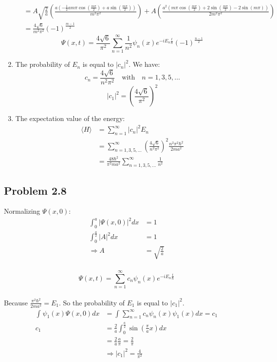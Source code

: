 \documentclass{article}
\begin{document}
\begin{enumerate}[label=(\alph*)]
\begin{align}
            &= A\sqrt{\frac{2}{a}} \left(\frac{a\left(-\frac{1}{2} a m \pi \cos\left(\frac{m \pi}{2}\right) + a \sin\left(\frac{m \pi}{2}\right)\right)}{m^2 \pi^2} \right) + A \left(\frac{a^2 \left(m \pi \cos\left(\frac{m \pi}{2}\right) + 2 \sin\left(\frac{m \pi}{2}\right)-2 \sin\left(m \pi\right)\right)}{2m^2 \pi^2}\right)\\
            &= \frac{4\sqrt{6}}{m^2 \pi^2} (-1)^{\frac{m-1}{2}}
        \end{align}
        \[\Psi(x,t)= \frac{4\sqrt{6}}{\pi^2} \sum_{n=1}^{\infty}\frac{1}{n^2}\psi_n(x)e^{-iE_n\frac{t}{\hbar}}(-1)^{\frac{n-1}{2}}\]
        
        \item The probability of \(E_n\) is equal to \(|c_n|^2\). We have: 
        \[c_n = \frac{4\sqrt{6}}{n^2 \pi^2} \quad \text{with} \quad n=1,3,5,\dots\]
        \[|c_1|^2 = \left(\frac{4\sqrt{6}}{\pi^2}\right)^2\]
        \item The expectation value of the energy:
        \begin{align}
            \langle H \rangle &= \sum_{n=1}^{\infty} |c_n|^2E_n \\
            &= \sum_{n=1,3,5,\dots}^{\infty} \left(\frac{4\sqrt{6}}{n^2 \pi^2}\right)^2 \frac{n^2 \pi^2 \hbar^2}{2ma^2} \\
            &= \frac{48\hbar^2}{\pi^2 m a^2}\sum_{n=1,3,5,\dots}^{\infty} \frac{1}{n^2}
        \end{align}
        
    \end{enumerate}
\endgroup
\subsection*{Problem 2.8}
\begingroup
\allowdisplaybreaks
Normalizing \(\Psi(x,0)\):
\begin{align}
    \int_{0}^{a} |\Psi(x,0)|^2 dx &= 1 \\
    \int_{0}^{\frac{a}{2}} |A|^2 dx &= 1 \\
    \Rightarrow A &= \sqrt{\frac{2}{a}} 
\end{align}
\\
\[\Psi(x,t) =  \sum_{n=1}^{\infty}c_n \psi_n(x) e^{-iE_n\frac{t}{\hbar}}\]
\\
Because \(\frac{\pi^2\hbar^2}{2ma^2} = E_1\). So the probability of \(E_1\) is equal to \(|c_1|^2\).
\begin{align}
    \int_{}^{} \psi_1(x)\Psi(x,0)dx &= \int_{}^{} \sum_{n=1}^{\infty} c_n \psi_n(x) \psi_1(x)dx = c_1\\
    c_1 &= \frac{2}{a} \int_{0}^{\frac{a}{2}} \sin \left(\frac{\pi}{a}x\right)dx \\
    &= \frac{2}{a} \frac{a}{\pi} = \frac{2}{\pi}\\
    &\Rightarrow |c_1|^2 = \frac{4}{\pi^2}
\end{align}

\endgroup
\end{document}

